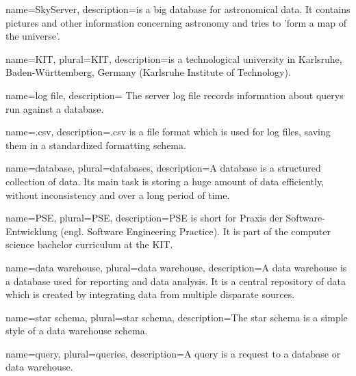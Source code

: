 {
  name=SkyServer,
  description={is a big \gls{database} for astronomical data. It contains pictures
              and other information concerning astronomy and tries to 'form a 
              map of the universe'.
              }
}


{
  name=KIT,
  plural=KIT,
  description={is a technological university in Karlsruhe, Baden-Württemberg, Germany 
              (Karlsruhe Institute of Technology).}
}


{
  name=log file,
  description={
The server log file records information about \glspl{query} run against a  \gls{database}.}
}


{
  name=.csv,
  description={.csv is a file format which is used for log files, 
  saving them in a standardized formatting schema.}
}


{
  name=database,
  plural=databases,
  description={A database is a structured collection of data. Its main task is
  storing a huge amount of data efficiently, without inconsistency and over a long period of time.   
  }
}


{
  name=PSE,
  plural=PSE,
  description={PSE is short for Praxis der Software-Entwicklung (engl. Software Engineering Practice).
  It is part of the computer science bachelor curriculum at the \gls{KIT}.}
}


{
  name=data warehouse,
  plural=data warehouse,
  description={A data warehouse is a \gls{database} used for reporting and data analysis.
  It is a central repository of data which is created by integrating data from multiple disparate sources.
  }
}
  
  
{
  name=star schema,
  plural=star schema,
  description={The star schema is a simple style of a \gls{data warehouse} schema.
 }
}

  
{
  name=query,
  plural=queries,
  description={A query is a request to a \gls{database} or \gls{data warehouse}.}
}


